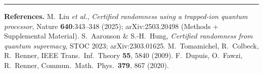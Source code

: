 \documentclass[11pt]{article}
\theoremstyle{definition}
\theoremstyle{plain}
\begin{document}
\vspace{0.5em}
\hrule
\vspace{0.5em}
\small
\noindent\textbf{References.}
M.\ Liu \emph{et al.}, \emph{Certified randomness using a trapped-ion quantum processor},
Nature \textbf{640}:343--348 (2025); arXiv:2503.20498 (Methods + Supplemental Material).\quad
S.\ Aaronson \& S.-H.\ Hung, \emph{Certified randomness from quantum supremacy}, STOC 2023;
arXiv:2303.01625.\quad
M.\ Tomamichel, R.\ Colbeck, R.\ Renner, IEEE Trans.\ Inf.\ Theory \textbf{55}, 5840 (2009).\quad
F.\ Dupuis, O.\ Fawzi, R.\ Renner, Commun.\ Math.\ Phys.\ \textbf{379}, 867 (2020).
\end{document}
